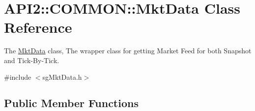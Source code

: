 \hypertarget{class_a_p_i2_1_1_c_o_m_m_o_n_1_1_mkt_data}{\section{A\-P\-I2\-:\-:C\-O\-M\-M\-O\-N\-:\-:Mkt\-Data Class Reference}
\label{class_a_p_i2_1_1_c_o_m_m_o_n_1_1_mkt_data}
}


The \hyperlink{class_a_p_i2_1_1_c_o_m_m_o_n_1_1_mkt_data}{Mkt\-Data} class, The wrapper class for getting Market Feed for both Snapshot and Tick-\/\-By-\/\-Tick.  




{\ttfamily \#include $<$sg\-Mkt\-Data.\-h$>$}

\subsection*{Public Member Functions}
